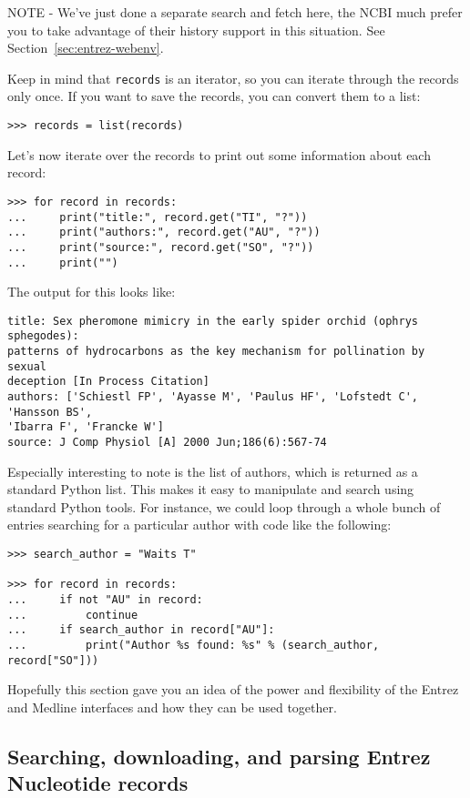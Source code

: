 \documentclass{report}
\begin{document}
NOTE - We've just done a separate search and fetch here, the NCBI much prefer you to take advantage of their history support in this situation.  See Section~\ref{sec:entrez-webenv}.

Keep in mind that \verb+records+ is an iterator, so you can iterate through the records only once. If you want to save the records, you can convert them to a list:
\begin{verbatim}
>>> records = list(records)
\end{verbatim}

Let's now iterate over the records to print out some information about each record:
\begin{verbatim}
>>> for record in records:
...     print("title:", record.get("TI", "?"))
...     print("authors:", record.get("AU", "?"))
...     print("source:", record.get("SO", "?"))
...     print("")
\end{verbatim}

The output for this looks like:
\begin{verbatim}
title: Sex pheromone mimicry in the early spider orchid (ophrys sphegodes):
patterns of hydrocarbons as the key mechanism for pollination by sexual
deception [In Process Citation]
authors: ['Schiestl FP', 'Ayasse M', 'Paulus HF', 'Lofstedt C', 'Hansson BS',
'Ibarra F', 'Francke W']
source: J Comp Physiol [A] 2000 Jun;186(6):567-74
\end{verbatim}

Especially interesting to note is the list of authors, which is returned as a standard Python list. This makes it easy to manipulate and search using standard Python tools. For instance, we could loop through a whole bunch of entries searching for a particular author with code like the following:
\begin{verbatim}
>>> search_author = "Waits T"

>>> for record in records:
...     if not "AU" in record:
...         continue
...     if search_author in record["AU"]:
...         print("Author %s found: %s" % (search_author, record["SO"]))
\end{verbatim}

Hopefully this section gave you an idea of the power and flexibility of the Entrez and Medline interfaces and how they can be used together.

\subsection{Searching, downloading, and parsing Entrez Nucleotide records}
\label{subsec:entrez_example_genbank}
\end{document}
